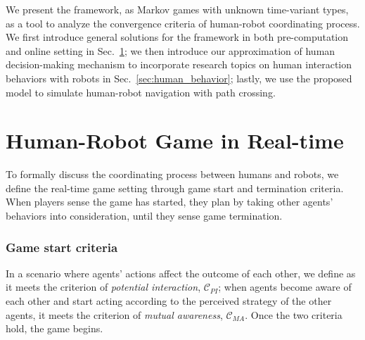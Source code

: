 \documentclass[letterpaper, 10 pt, conference]{ieeeconf}  %
\begin{document}
We present the framework, as Markov games with unknown time-variant types,  
as a tool to analyze the convergence criteria of human-robot coordinating 
process. We first 
introduce general solutions for the framework in both pre-computation and 
online setting in Sec.~\ref{sec:realtime_game}; we then introduce our approximation of human 
decision-making mechanism to incorporate research topics on 
human interaction behaviors with robots in Sec.~\ref{sec:human_behavior}; 
lastly, we use the proposed model to simulate human-robot navigation with path 
crossing.


\vspace{-.2em}
\section{Human-Robot Game in Real-time}\label{sec:realtime_game}
To formally discuss the coordinating process between humans and robots, we 
define the real-time game setting through game start and termination criteria. 
When players sense the game has started, they plan by taking other agents' 
behaviors into consideration, until they sense game termination. 
\subsubsection{Game start criteria}
In a scenario where agents' actions affect the outcome of each other, we 
define as it meets the criterion of \textit{potential interaction}, 
$\mathcal{C}_{PI}$; when agents become aware of each other and start acting 
according to the perceived strategy of the other agents, it meets the criterion 
of \textit{mutual awareness}, $\mathcal{C}_{MA}$. Once the two criteria hold, 
the game begins. 
\end{document}
